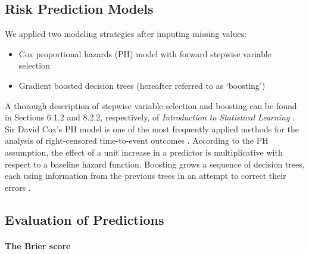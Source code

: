 \documentclass{article}
\begin{document}
\hypertarget{risk-prediction-models}{%
\subsection{Risk Prediction Models}\label{risk-prediction-models}}

\label{subsec:modeling}

We applied two modeling strategies after imputing missing values:

\begin{itemize}
\tightlist
\item
  Cox proportional hazards (PH) model with forward stepwise variable
  selection
\item
  Gradient boosted decision trees (hereafter referred to as `boosting')
\end{itemize}

A thorough description of stepwise variable selection and boosting can
be found in Sections 6.1.2 and 8.2.2, respectively, of
\emph{Introduction to Statistical Learning}
\cite{james2013introduction}. Sir David Cox's PH model is one of the
most frequently applied methods for the analysis of right-censored
time-to-event outcomes \cite{kleinbaum2010survival}. According to the PH
assumption, the effect of a unit increase in a predictor is
multiplicative with respect to a baseline hazard function. Boosting
grows a sequence of decision trees, each using information from the
previous trees in an attempt to correct their errors
\cite{friedman2001greedy, chen2016xgboost}.

\hypertarget{evaluation-of-predictions}{%
\subsection{Evaluation of Predictions}\label{evaluation-of-predictions}}

\label{subsec:evaluation}

\paragraph{The Brier score}
\end{document}

